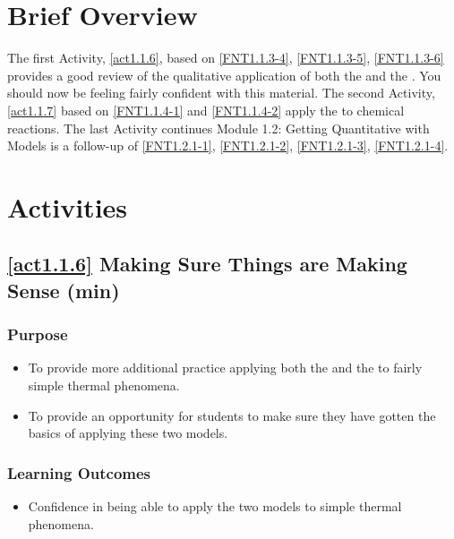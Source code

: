 \section*{Brief Overview}
The first \CLASP{} Activity, \ref{act1.1.6}, based on \ref{FNT1.1.3-4}, \ref{FNT1.1.3-5}, \ref{FNT1.1.3-6} provides a good review of the qualitative application of both the \ThreePhaseModel{} and the \EnergyInteractionModel{}. You should now be feeling fairly confident with this material. The second Activity, \ref{act1.1.7} based on \ref{FNT1.1.4-1} and \ref{FNT1.1.4-2} apply the \EnergyInteractionModel{} to chemical reactions. The last \CLASP{} Activity continues Module 1.2: Getting Quantitative with Models is a follow-up of \ref{FNT1.2.1-1}, \ref{FNT1.2.1-2}, \ref{FNT1.2.1-3}, \ref{FNT1.2.1-4}.
	
\section*{\CLASP{} Activities}
	
\subsection*{\ref{act1.1.6} Making Sure Things are Making Sense	(\about\unit[35]{min})}
	
\subsubsection*{Purpose}

\begin{itemize}
	\item To provide more additional practice applying both the \ThreePhaseModel{} and the \EnergyInteractionModel{} to fairly simple thermal phenomena.
	\item To provide an opportunity for students to make sure they have gotten the basics of applying these two models.
\end{itemize}

\subsubsection*{Learning Outcomes}
\begin{itemize}
	\item Confidence in being able to apply the two models to simple thermal phenomena.
\end{itemize}

